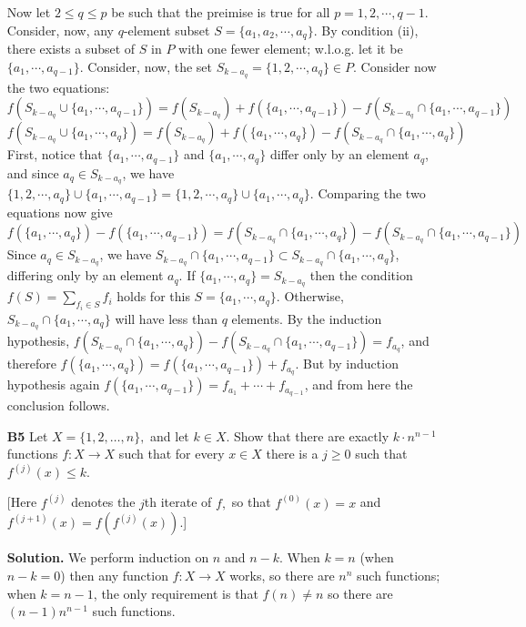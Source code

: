 \documentclass[11pt,a4paper]{article}
\newcommand{\<}{\langle}
\renewcommand{\>}{\rangle}
\newcommand{\dsum}{\displaystyle\sum}
\begin{document}
\begin{enumerate}
	Now let $2\le q\le p$ be such that the preimise is true for all $p=1, 2, \cdots , q-1$. Consider, now, any $q$-element subset $S=\{a_1, a_2, \cdots , a_q\}$. By condition (ii), there exists a subset of $S$ in $P$ with one fewer element; w.l.o.g. let it be $\{a_1, \cdots , a_{q-1}\}$. Consider, now, the set $S_{k-a_q}=\{1, 2, \cdots , a_q\}\in P.$ Consider now the two equations: 
	\[
	f(S_{k-a_q}\cup \{a_1, \cdots , a_{q-1}\}) = f(S_{k-a_q}) + f(\{a_1, \cdots , a_{q-1}\}) - f(S_{k-a_q}\cap \{a_1, \cdots , a_{q-1}\})
	\]
	\[
	f(S_{k-a_q}\cup \{a_1, \cdots , a_{q}\}) = f(S_{k-a_q}) + f(\{a_1, \cdots , a_{q}\}) - f(S_{k-a_q}\cap \{a_1, \cdots , a_{q}\})
	\]
	First, notice that $\{a_1, \cdots , a_{q-1}\}$ and $\{a_1, \cdots , a_{q}\}$ differ only by an element $a_q$, and since $a_q\in S_{k-a_q}$, we have $\{1, 2, \cdots , a_q\}\cup \{a_1, \cdots , a_{q-1}\} = \{1, 2, \cdots , a_q\}\cup \{a_1, \cdots , a_{q}\}$. 
	Comparing the two equations now give
	\[
	f(\{a_1, \cdots , a_{q}\}) - f(\{a_1, \cdots , a_{q-1}\}) = f(S_{k-a_q}\cap \{a_1, \cdots , a_{q}\}) - f(S_{k-a_q}\cap \{a_1, \cdots , a_{q-1}\})
	\]
	Since $a_q\in S_{k-a_q}$, we have $S_{k-a_q}\cap \{a_1, \cdots , a_{q-1}\}\subset S_{k-a_q}\cap \{a_1, \cdots , a_{q}\}$, differing only by an element $a_q$. 
	If $\{a_1, \cdots , a_q\}=S_{k-a_q}$ then the condition $f(S)=\dsum_{f_i\in S}f_i$ holds for this $S=\{a_1, \cdots, a_q\}$. 
	Otherwise, $S_{k-a_q}\cap \{a_1, \cdots , a_{q}\}$ will have less than $q$ elements. By the induction hypothesis, $f(S_{k-a_q}\cap \{a_1, \cdots , a_{q}\}) - f(S_{k-a_q}\cap \{a_1, \cdots , a_{q-1}\})=f_{a_q}$, and therefore $f(\{a_1, \cdots , a_{q}\}) = f(\{a_1, \cdots , a_{q-1}\}) + f_{a_q}$. But by induction hypothesis again $f(\{a_1, \cdots , a_{q-1}\}) = f_{a_1} + \cdots + f_{a_{q-1}}$, and from here the conclusion follows. 
	
	\item[\textbf{B5}] Let $X=\{1,2,\dots,n\},$ and let $k\in X.$ Show that there are exactly $k\cdot n^{n-1}$ functions $f:X\to X$ such that for every $x\in X$ there is a $j\ge 0$ such that $f^{(j)}(x)\le k.$
	
	[Here $f^{(j)}$ denotes the $j$th iterate of $f,$ so that $f^{(0)}(x)=x$ and $f^{(j+1)}(x)=f\left(f^{(j)}(x)\right).$]
	
	\textbf{Solution.} We perform induction on $n$ and $n-k$. When $k=n$ (when $n-k=0$) then any function $f:X\to X$ works, so there are $n^n$ such functions; when $k=n-1$, the only requirement is that $f(n)\neq n$ so there are $(n-1)n^{n-1}$ such functions. 
	

\end{enumerate}
\end{document}
